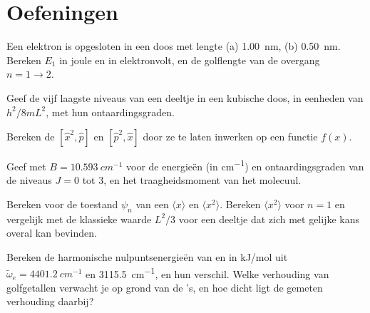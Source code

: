 \section{Oefeningen}

\begin{exercise}[$\star$]\label{exo:b3:quantum-model-systems:1}
Een elektron is opgesloten in een doos met lengte (a) \qty{1.00}{nm}, (b)
\qty{0.50}{nm}. Bereken $E_1$ in joule en in elektronvolt, en de golflengte
van de overgang $n = 1 \to 2$.
\end{exercise}

\begin{exercise}[$\star$]\label{exo:b3:quantum-model-systems:2}
Geef de vijf laagste niveaus van een deeltje in een kubische doos, in
eenheden van
$h^2/8mL^2$, met hun ontaardingsgraden.
\end{exercise}

\begin{exercise}[$\star$]\label{exo:b3:quantum-model-systems:3}
Bereken de  $[\hat x^2,\hat p]$ en $[\hat p^2,\hat x]$ door ze
te laten inwerken op een functie $f(x)$.
\end{exercise}

\begin{exercise}[$\star$]\label{exo:b3:quantum-model-systems:4}
Geef met $B = \qty{10.593}{cm^{-1}}$ voor  de energieën (in
\unit{cm^{-1}}) en ontaardingsgraden van de niveaus $J = 0$ tot 3, en het
traagheidsmoment van het molecuul.
\end{exercise}

\begin{exercise}[$\star\star$]\label{exo:b3:quantum-model-systems:5}
Bereken voor de toestand $\psi_n$ van een  $\langle x\rangle$ en
$\langle x^2\rangle$. Bereken $\langle x^2\rangle$ voor $n = 1$ en vergelijk met
de klassieke waarde $L^2/3$ voor een deeltje dat zich met gelijke kans
overal kan bevinden.
\end{exercise}

\begin{exercise}[$\star\star$]\label{exo:b3:quantum-model-systems:6}
Bereken de harmonische nulpuntsenergieën van  en  in
\unit{kJ/mol} uit $\tilde\omega_e = \qty{4401.2}{cm^{-1}}$ en
\qty{3115.5}{cm^{-1}}, en hun verschil. Welke verhouding van golfgetallen
verwacht je op grond van de 's, en hoe dicht ligt de
gemeten verhouding daarbij?
\end{exercise}

